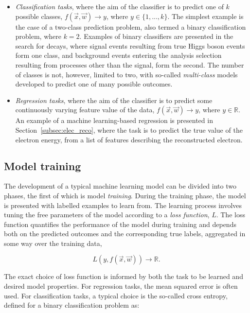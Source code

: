 \begin{itemize}
    \item \textit{Classification tasks}, where the aim of the classifier is to predict one of $k$ possible classes,  $f(\vec{x},\vec{w})\rightarrow y$, where $y\in\{1, ..., k\}$. The simplest example is the case of a two-class prediction problem, also termed a binary classification problem, where $k=2$. Examples of binary classifiers are presented in the search for \Hee decays, where signal events resulting from true Higgs boson events form one class, and background events entering the analysis selection resulting from processes other than the signal, form the second. The number of classes is not, however, limited to two, with so-called \textit{multi-class} models developed to predict one of many possible outcomes.
    \item \textit{Regression tasks}, where the aim of the classifier is to predict some continuously varying feature value of the data, $f(\vec{x},\vec{w})\rightarrow y$, where $y\in\mathbb{R}$. An example of a machine learning-based regression is presented in Section~\ref{subsec:elec_reco}, where the task is to predict the true value of the electron energy, from a list of features describing the reconstructed electron. 
\end{itemize}

\subsection{Model training}
\label{subsec:ML_model_training}

The development of a typical machine learning model can be divided into two phases, the first of which is model \textit{training}. During the training phase, the model is presented with labelled examples to learn from. The learning process involves tuning the free parameters of the model according to a \textit{loss function}, $L$. The loss function quantifies the performance of the model during training and depends both on the predicted outcomes and the corresponding true labels, aggregated in some way over the training data,

$$L(y,f(\vec{x},\vec{w})) \rightarrow \mathbb{R}.$$

\noindent The exact choice of loss function is informed by both the task to be learned and desired model properties. For regression tasks, the mean squared error is often used. For classification tasks, a typical choice is the so-called cross entropy, defined for a binary classification problem as:

